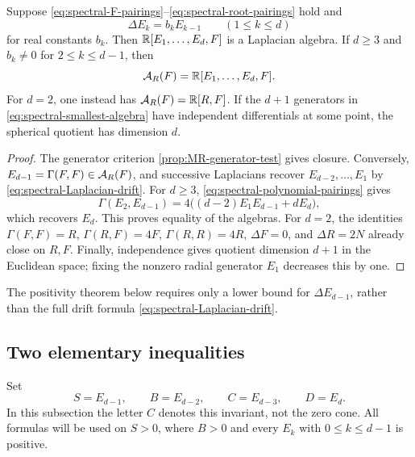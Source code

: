 \begin{proposition}
\label{prop:spectral-smallest-algebra}
Suppose \eqref{eq:spectral-F-pairings}--\eqref{eq:spectral-root-pairings}
hold and
\begin{equation}\label{eq:spectral-Laplacian-drift}
 \Delta E_k=b_kE_{k-1}\qquad(1\le k\le d)
\end{equation}
for real constants \(b_k\).  Then
\(\mathbb R[E_1,\ldots,E_d,F]\) is a Laplacian algebra.
If \(d\ge3\) and \(b_k\ne0\) for \(2\le k\le d-1\), then
\begin{equation}\label{eq:spectral-smallest-algebra}
 \mathcal A_R(F)=\mathbb R[E_1,\ldots,E_d,F].
\end{equation}
For \(d=2\), one instead has \(\mathcal A_R(F)=\mathbb R[R,F]\).
If the \(d+1\) generators in \eqref{eq:spectral-smallest-algebra}
have independent differentials at some point, the spherical quotient
has dimension \(d\).
\end{proposition}

\begin{proof}
The generator criterion \cref{prop:MR-generator-test} gives closure.
Conversely, \(E_{d-1}=\Gamma(F,F)\in\mathcal A_R(F)\), and successive
Laplacians recover \(E_{d-2},\ldots,E_1\) by
\eqref{eq:spectral-Laplacian-drift}.  For \(d\ge3\),
\eqref{eq:spectral-polynomial-pairings} gives
\begin{equation}\label{eq:norm-product-top-recovery}
 \Gamma(E_2,E_{d-1})
 =4\bigl((d-2)E_1E_{d-1}+dE_d\bigr),
\end{equation}
which recovers \(E_d\).  This proves equality of the algebras.
For \(d=2\), the identities
\(\Gamma(F,F)=R\), \(\Gamma(R,F)=4F\),
\(\Gamma(R,R)=4R\), \(\Delta F=0\), and \(\Delta R=2N\)
already close on \(R,F\).  Finally, independence gives quotient
dimension \(d+1\) in the Euclidean space; fixing the nonzero radial
generator \(E_1\) decreases this by one.
\end{proof}

The positivity theorem below requires only a lower bound for
\(\Delta E_{d-1}\), rather than the full drift formula
\eqref{eq:spectral-Laplacian-drift}.

\subsection{Two elementary inequalities}

Set
\begin{equation}\label{eq:spectral-SBCD}
 S=E_{d-1},\qquad B=E_{d-2},\qquad
 C=E_{d-3},\qquad D=E_d.
\end{equation}
In this subsection the letter \(C\) denotes this invariant, not the
zero cone.  All formulas will be used on \(S>0\), where
\(B>0\) and every \(E_k\) with \(0\le k\le d-1\) is positive.

